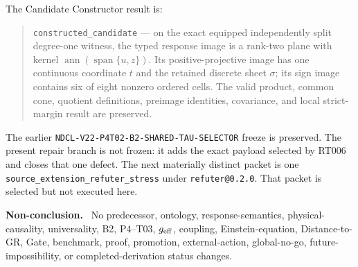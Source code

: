 \documentclass[11pt]{article}
\newenvironment{nonconclusion}{\par\smallskip\small\noindent\textbf{Non-conclusion.}\ }{\par\smallskip}
\newcommand{\ann}{\operatorname{ann}}
\begin{document}
The Candidate Constructor result is:
\begin{quote}
\texttt{constructed\_candidate} --- on the exact equipped independently split
degree-one witness, the typed response image is a rank-two plane with kernel
$\ann(\operatorname{span}\{u,z\})$.  Its positive-projective image has one
continuous coordinate $t$ and the retained discrete sheet $\sigma$; its sign
image contains six of eight nonzero ordered cells.  The valid product, common
cone, quotient definitions, preimage identities, covariance, and local
strict-margin result are preserved.
\end{quote}

The earlier
\texttt{NDCL-V22-P4T02-B2-SHARED-TAU-SELECTOR} freeze is preserved.  The
present repair branch is not frozen: it adds the exact payload selected by
RT006 and closes that one defect.  The next materially distinct packet is one
\texttt{source\_extension\_refuter\_stress} under
\texttt{refuter@0.2.0}.  That packet is selected but not executed here.

\begin{nonconclusion}
No predecessor, ontology, response-semantics, physical-causality, universality,
B2, P4--T03, $g_{\rm eff}$, coupling, Einstein-equation, Distance-to-GR,
Gate, benchmark, proof, promotion, external-action, global-no-go,
future-impossibility, or completed-derivation status changes.
\end{nonconclusion}
\end{document}
